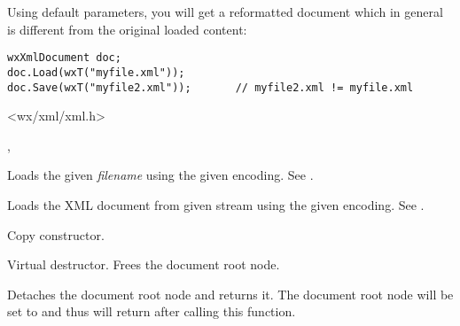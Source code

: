 Using default parameters, you will get a reformatted document which in general is different from
the original loaded content:

\begin{verbatim}
wxXmlDocument doc;
doc.Load(wxT("myfile.xml"));
doc.Save(wxT("myfile2.xml"));       // myfile2.xml != myfile.xml
\end{verbatim}





<wx/xml/xml.h>


, 




\label{wxxmldocumentwxxmldocument}




Loads the given {\it filename} using the given encoding. See .


Loads the XML document from given stream using the given encoding. See .


Copy constructor.

\label{wxxmldocumentdtor}


Virtual destructor. Frees the document root node.


\label{wxxmldocumentdetachroot}


Detaches the document root node and returns it. The document root node will be set to \NULL
and thus  will return \false after calling this function.

